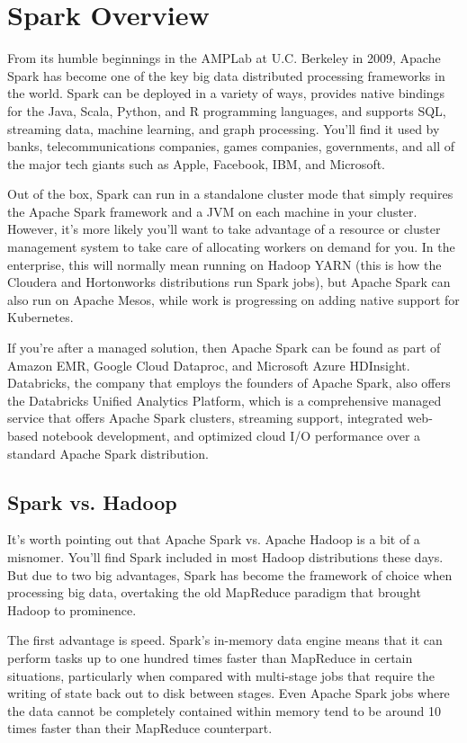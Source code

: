 \documentclass[a4paper,12pt]{article}
\begin{document}
\section*{Spark Overview}

From its humble beginnings in the AMPLab at U.C. Berkeley in 2009, Apache Spark has become one of the key big data distributed processing frameworks in the world. Spark can be deployed in a variety of ways, provides native bindings for the Java, Scala, Python, and R programming languages, and supports SQL, streaming data, machine learning, and graph processing. You’ll find it used by banks, telecommunications companies, games companies, governments, and all of the major tech giants such as Apple, Facebook, IBM, and Microsoft.

Out of the box, Spark can run in a standalone cluster mode that simply requires the Apache Spark framework and a JVM on each machine in your cluster. However, it’s more likely you’ll want to take advantage of a resource or cluster management system to take care of allocating workers on demand for you. In the enterprise, this will normally mean running on Hadoop YARN (this is how the Cloudera and Hortonworks distributions run Spark jobs), but Apache Spark can also run on Apache Mesos, while work is progressing on adding native support for Kubernetes.

If you’re after a managed solution, then Apache Spark can be found as part of Amazon EMR, Google Cloud Dataproc, and Microsoft Azure HDInsight. Databricks, the company that employs the founders of Apache Spark, also offers the Databricks Unified Analytics Platform, which is a comprehensive managed service that offers Apache Spark clusters, streaming support, integrated web-based notebook development, and optimized cloud I/O performance over a standard Apache Spark distribution.

\subsection{Spark vs. Hadoop}

It’s worth pointing out that Apache Spark vs. Apache Hadoop is a bit of a misnomer. You’ll find Spark included in most Hadoop distributions these days. But due to two big advantages, Spark has become the framework of choice when processing big data, overtaking the old MapReduce paradigm that brought Hadoop to prominence.

The first advantage is speed. Spark’s in-memory data engine means that it can perform tasks up to one hundred times faster than MapReduce in certain situations, particularly when compared with multi-stage jobs that require the writing of state back out to disk between stages. Even Apache Spark jobs where the data cannot be completely contained within memory tend to be around 10 times faster than their MapReduce counterpart.
\end{document}
